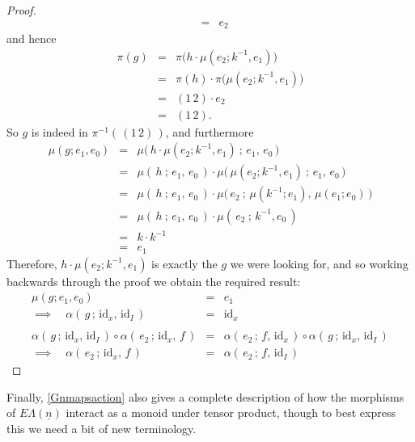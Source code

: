\documentclass{amsbook} %
\newcommand{\ELn}{E\Lambda(\underline{n})}
\numberwithin{section}{chapter}
\begin{document}
\begin{proof}
\[\begin{array}{rll}
		& = & e_2
		\end{array}
\]
and hence
\[\begin{array}{rll}
		\pi(g) & = & \pi \big( h \cdot \mu(e_2; k^{-1}, e_1) \big) \\
		& = & \pi(h) \cdot \pi \big(\mu(e_2; k^{-1}, e_1) \big) \\
		& = & (1 \, 2) \cdot e_2 \\
		& = & (1 \, 2)
		.\end{array}
\]
So $g$ is indeed in $\pi^{-1}( \, (1 \, 2) \, )$, and furthermore
\[\begin{array}{rll}
		\mu(g; e_1, e_0) & = & \mu \big( \, h \cdot \mu(e_2; k^{-1}, e_1) \ ; \, e_1, \, e_0 \, \big) \\
		& = & \mu( \, h \ ; \, e_1, \, e_0 \, ) \cdot \mu \big( \, \mu(e_2; k^{-1}, e_1) \ ; \, e_1, \, e_0 \, \big) \\
		& = & \mu( \, h \ ; \, e_1, \, e_0 \, ) \cdot \mu \big( \, e_2 \ ; \, \mu(k^{-1}; e_1), \, \mu(e_1; e_0) \, \big) \\
		& = & \mu( \, h \ ; \, e_1, \, e_0 \, ) \cdot \mu( \, e_2 \ ; \, k^{-1}, e_0 \, ) \\
		& = & k \cdot k^{-1} \\
		& = & e_1
		\end{array}
\]
Therefore, $h \cdot \mu(e_2; k^{-1}, e_1)$ is exactly the $g$ we were looking for, and so working backwards through the proof we obtain the required result:
\[ \begin{array}{rll}
		\mu(g; e_1, e_0) & = & e_1 \\
		\implies \quad \alpha( \, g \, ; \, \mathrm{id}_x, \, \mathrm{id}_I \, ) & = & \mathrm{id}_x \\
		& & \\
		\alpha( \, g \, ; \, \mathrm{id}_x, \, \mathrm{id}_I \, ) \circ \alpha( \, e_2 \, ; \, \mathrm{id}_x, \, f \, ) & = & \alpha( \, e_2 \, ; \, f, \, \mathrm{id}_x \, ) \circ \alpha( \, g \, ; \, \mathrm{id}_x, \, \mathrm{id}_I \, ) \\
		\implies \quad \alpha( \, e_2 \, ; \, \mathrm{id}_x, \, f \, ) & = & \alpha( \, e_2 \, ; \, f, \, \mathrm{id}_I \, )
		\end{array}
\]
\end{proof} 

Finally, \cref{Gnmapsaction} also gives a complete description of how the morphisms of $\ELn$ interact as a monoid under tensor product, though to best express this we need a bit of new terminology.
\end{document}
